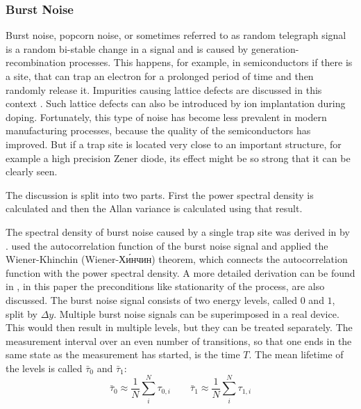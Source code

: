 \subsubsection{Burst Noise}%
\label{sec:theory_burst_noise}
Burst noise, popcorn noise, or sometimes referred to as random telegraph signal is a random bi-stable change in a signal and is caused by generation-recombination processes. This happens, for example, in semiconductors if there is a site, that can trap an electron for a prolonged period of time and then randomly release it. Impurities causing lattice defects are discussed in this context \cite{kay2012operational,burst_noise_psd,popcorn_noise_orgin,technote_ti_popcorn_noise}. Such lattice defects can also be introduced by ion implantation during doping. Fortunately, this type of noise has become less prevalent in modern manufacturing processes, because the quality of the semiconductors has improved. But if a trap site is located very close to an important structure, for example a high precision Zener diode, its effect might be so strong that it can be clearly seen.

The discussion is split into two parts. First the power spectral density is calculated and then the Allan variance is calculated using that result.

The spectral density of burst noise caused by a single trap site was derived in \cite{burst_noise_wiener_khinchin} by \citeauthor{burst_noise_wiener_khinchin}. \citeauthor{burst_noise_wiener_khinchin} used the autocorrelation function of the burst noise signal and applied the Wiener-Khinchin (Wiener-Хи́нчин) theorem, which connects the autocorrelation function with the power spectral density. A more detailed derivation can be found in \cite{fundamentals_of_noise_processes}, in this paper the preconditions like stationarity of the process, are also discussed. The burst noise signal consists of two energy levels, called $0$ and $1$, split by $\Delta y$. Multiple burst noise signals can be superimposed in a real device. This would then result in multiple levels, but they can be treated separately. The measurement interval over an even number of transitions, so that one ends in the same state as the measurement has started, is the time $T$. The mean lifetime of the levels is called $\bar \tau_0$ and $\bar \tau_1$:
\begin{equation}
    \bar \tau_{0} \approx \frac 1 N \sum_{i}^N \tau_{0,i} \qquad \bar \tau_{1} \approx \frac 1 N \sum_{i}^N \tau_{1,i}
\end{equation}

